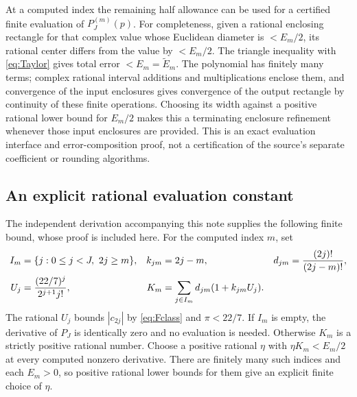 \documentclass[11pt]{article}
\begin{document}
At a computed index the remaining half allowance can be used
for a certified finite evaluation of $P_J^{(m)}(p)$.
For completeness, given a rational enclosing rectangle for
that complex value whose Euclidean diameter is $<E_m/2$,
its rational center differs from the value by $<E_m/2$.
The triangle inequality with \eqref{eq:Taylor} gives total
error $<E_m=\widetilde E_m$. The polynomial has finitely
many terms; complex rational interval additions and
multiplications enclose them, and convergence of the input
enclosures gives convergence of the output rectangle by
continuity of these finite operations. Choosing its width
against a positive rational lower bound for $E_m/2$ makes
this a terminating enclosure refinement whenever those
input enclosures are provided. This is an exact evaluation
interface and error-composition proof, not a certification
of the source's separate coefficient or rounding algorithms.

\subsection{An explicit rational evaluation constant}
\label{sec:evaluation}
The independent derivation accompanying this note supplies
the following finite bound, whose proof is included here.
For the computed index $m$, set
\begin{align}
I_m&=\{j:0\le j<J,\ 2j\ge m\},&
k_{jm}&=2j-m,& d_{jm}&=\frac{(2j)!}{(2j-m)!},\notag\\
U_j&=\frac{(22/7)^j}{2^{j+1}j!},&
K_m&=\sum_{j\in I_m}d_{jm}(1+k_{jm}U_j).
\label{eq:Km}
\end{align}
The rational $U_j$ bounds $|c_{2j}|$ by \eqref{eq:Fclass}
and $\pi<22/7$. If $I_m$ is empty, the derivative of $P_J$
is identically zero and no evaluation is needed. Otherwise
$K_m$ is a strictly positive rational number. Choose a
positive rational $\eta$ with $\eta K_m<E_m/2$ at every
computed nonzero derivative. There are finitely many such
indices and each $E_m>0$, so positive rational lower bounds
for them give an explicit finite choice of $\eta$.
\end{document}
